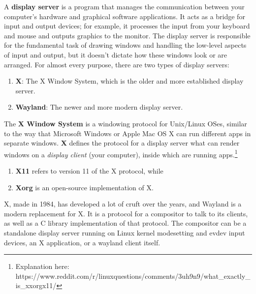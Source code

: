 \documentclass{article}
\begin{document}
  \begin{definition}
    A \textbf{display server} is a program that manages the communication between your computer's hardware and graphical software applications. It acts as a bridge for input and output devices; for example, it processes the input from your keyboard and mouse and outputs graphics to the monitor. The display server is responsible for the fundamental task of drawing windows and handling the low-level aspects of input and output, but it doesn't dictate how these windows look or are arranged. For almost every purpose, there are two types of display servers: 
    \begin{enumerate} 
      \item \textbf{X}: The X Window System, which is the older and more established display server. 
      \item \textbf{Wayland}: The newer and more modern display server.
    \end{enumerate}
  \end{definition}

  \begin{definition}
    The \textbf{X Window System} is a windowing protocol for Unix/Linux OSes, similar to the way that Microsoft Windows or Apple Mac OS X can run different apps in separate windows. \textbf{X} defines the protocol for a display server what can render windows on a \textit{display client} (your computer), inside which are running apps.\footnote{Explanation here: https://www.reddit.com/r/linuxquestions/comments/3uh9n9/what\_exactly\_is\_xxorgx11/} 
    \begin{enumerate} 
      \item \textbf{X11} refers to version 11 of the X protocol, while 
      \item \textbf{Xorg} is an open-source implementation of X. 
    \end{enumerate}
  \end{definition}

  \begin{definition}[Wayland]
    X, made in 1984, has developed a lot of cruft over the years, and Wayland is a modern replacement for X. It is a protocol for a compositor to talk to its clients, as well as a C library implementation of that protocol. The compositor can be a standalone display server running on Linux kernel modesetting and evdev input devices, an X application, or a wayland client itself. 
  \end{definition}
\end{document}
